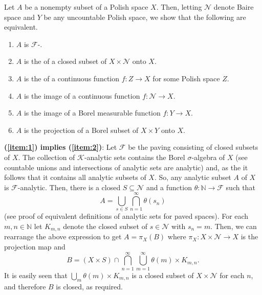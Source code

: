 \documentclass[12pt]{article}
\begin{document}

Let $A$ be a nonempty subset of a Polish space $X$. Then, letting $\mathcal{N}$ denote Baire space and $Y$ be any uncountable Polish space, we show that the following are equivalent.
\begin{enumerate}
\item\label{item:1} $A$ is $\mathcal{F}$-.
\item\label{item:2} $A$ is the  of a closed subset of $X\times\mathcal{N}$ onto $X$.
\item\label{item:3} $A$ is the  of a continuous function $f\colon Z\to X$ for some Polish space $Z$.
\item\label{item:4} $A$ is the image of a continuous function $f\colon \mathcal{N}\to X$.
\item\label{item:5} $A$ is the image of a Borel measurable function $f\colon Y\to X$.
\item\label{item:6} $A$ is the projection of a Borel subset of $X\times Y$ onto $X$.
\end{enumerate}

\noindent\textbf{(\ref{item:1}) implies (\ref{item:2})}:
Let $\mathcal{F}$ be the paving consisting of closed subsets of $X$. The collection of $\mathcal{K}$-analytic sets contains the Borel $\sigma$-algebra of $X$ (see countable unions and intersections of analytic sets are analytic) and, as the  it follows that it contains all analytic subsets of $X$. So, any analytic subset $A$ of $X$ is $\mathcal{F}$-analytic.
Then, there is a closed $S\subseteq\mathcal{N}$ and a function $\theta\colon\mathbb{N}\to\mathcal{F}$ such that
\begin{equation*}
A=\bigcup_{s\in S}\bigcap_{n=1}^\infty\theta(s_n)
\end{equation*}
(see proof of equivalent definitions of analytic sets for paved spaces).
For each $m,n\in\mathbb{N}$ let $K_{m,n}$ denote the closed subset of $s\in\mathcal{N}$ with $s_n=m$. Then, we can rearrange the above expression to get $A=\pi_X(B)$ where $\pi_X\colon X\times\mathcal{N}\to X$ is the projection map and
\begin{equation*}
B=(X\times S)\cap \bigcap_{n=1}^\infty\bigcup_{m=1}^\infty\theta(m)\times K_{m,n}.
\end{equation*}
It is easily seen that $\bigcup_m\theta(m)\times K_{m,n}$ is a closed subset of $X\times\mathcal{N}$ for each $n$, and therefore $B$ is closed, as required.
\end{document}
